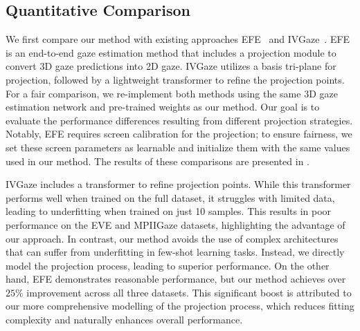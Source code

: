 
\subsection{Quantitative Comparison}
We first compare our method with existing approaches EFE~\cite{Balim_2023_CVPR} and IVGaze~\cite{cheng2024ivgaze}. EFE is an end-to-end gaze estimation method that includes a projection module to convert 3D gaze predictions into 2D gaze. IVGaze utilizes a basis tri-plane for projection, followed by a lightweight transformer to refine the projection points.
For a fair comparison, we re-implement both methods using the same 3D gaze estimation network and pre-trained weights as our method. Our goal is to evaluate the performance differences resulting from different projection strategies. Notably, EFE requires screen calibration for the projection; to ensure fairness, we set these screen parameters as learnable and initialize them with the same values used in our method.
The results of these comparisons are presented in .

IVGaze includes a transformer to refine projection points. While this transformer performs well when trained on the full dataset, it struggles with limited data, leading to underfitting when trained on just 10 samples. This results in poor performance on the EVE and MPIIGaze datasets, highlighting the advantage of our approach.
In contrast, our method avoids the use of complex architectures that can suffer from underfitting in few-shot learning tasks. Instead, we directly model the projection process, leading to superior performance.
On the other hand, EFE demonstrates reasonable performance, but our method achieves over $25\%$ improvement across all three datasets. This significant boost is attributed to our more comprehensive modelling of the projection process, which reduces fitting complexity and naturally enhances overall performance.


